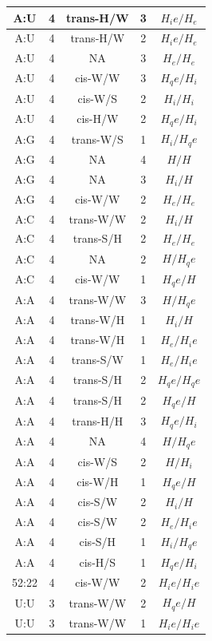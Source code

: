 \begin{center}
\begin{longtable}{c|c|c|c|c}
A:U & 4 & trans-H/W & 3 & $H_ie/H_e$ \\  \hline
A:U & 4 & trans-H/W & 2 & $H_ie/H_e$ \\  \hline
A:U & 4 & NA & 3 & $H_e/H_e$ \\  \hline
A:U & 4 & cis-W/W & 3 & $H_qe/H_i$ \\  \hline
A:U & 4 & cis-W/S & 2 & $H_i/H_i$ \\  \hline
A:U & 4 & cis-H/W & 2 & $H_qe/H_i$ \\  \hline
A:G & 4 & trans-W/S & 1 & $H_i/H_qe$ \\  \hline
A:G & 4 & NA & 4 & $H/H$ \\  \hline
A:G & 4 & NA & 3 & $H_i/H$ \\  \hline
A:G & 4 & cis-W/W & 2 & $H_e/H_e$ \\  \hline
A:C & 4 & trans-W/W & 2 & $H_i/H$ \\  \hline
A:C & 4 & trans-S/H & 2 & $H_e/H_e$ \\  \hline
A:C & 4 & NA & 2 & $H/H_qe$ \\  \hline
A:C & 4 & cis-W/W & 1 & $H_qe/H$ \\  \hline
A:A & 4 & trans-W/W & 3 & $H/H_qe$ \\  \hline
A:A & 4 & trans-W/H & 1 & $H_i/H$ \\  \hline
A:A & 4 & trans-W/H & 1 & $H_e/H_ie$ \\  \hline
A:A & 4 & trans-S/W & 1 & $H_e/H_ie$ \\  \hline
A:A & 4 & trans-S/H & 2 & $H_qe/H_qe$ \\  \hline
A:A & 4 & trans-S/H & 2 & $H_qe/H$ \\  \hline
A:A & 4 & trans-H/H & 3 & $H_qe/H_i$ \\  \hline
A:A & 4 & NA & 4 & $H/H_qe$ \\  \hline
A:A & 4 & cis-W/S & 2 & $H/H_i$ \\  \hline
A:A & 4 & cis-W/H & 1 & $H_qe/H$ \\  \hline
A:A & 4 & cis-S/W & 2 & $H_i/H$ \\  \hline
A:A & 4 & cis-S/W & 2 & $H_e/H_ie$ \\  \hline
A:A & 4 & cis-S/H & 1 & $H_i/H_qe$ \\  \hline
A:A & 4 & cis-H/S & 1 & $H_qe/H_i$ \\  \hline
52:22 & 4 & cis-W/W & 2 & $H_ie/H_ie$ \\  \hline
U:U & 3 & trans-W/W & 2 & $H_qe/H$ \\  \hline
U:U & 3 & trans-W/W & 1 & $H_ie/H_ie$ \\  \hline

\end{longtable}
\end{center}
